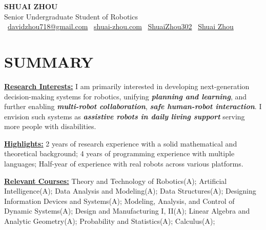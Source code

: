 \documentclass[a4paper,9pt]{extarticle}
\begin{document}
\pagestyle{fancy}
\renewcommand{\headrulewidth}{0pt}
\fancyhead{}
\thispagestyle{empty} %

\begin{center}
{\fontsize{24pt}{36pt}\selectfont\textbf{SHUAI ZHOU}}\\[3pt] %
Senior Undergraduate Student of Robotics \\[2pt]
\faEnvelope\ \href{mailto:davidzhou718@gmail.com}{davidzhou718@gmail.com}
\quad \textbar{} \quad
\faHome\ \href{https://www.shuai-zhou.com}{shuai-zhou.com}
\quad \textbar{} \quad
\faGithub\ \href{https://github.com/ShuaiZhou302}{ShuaiZhou302}
\quad \textbar{} \quad
\faGraduationCap\ \href{https://scholar.google.com/citations?user=ONn1TXAAAAAJ&hl=en&oi=sra}{Shuai Zhou}
\end{center}

\section*{{\textbf{\fontsize{14pt}{8pt}\selectfont S}\textbf{\scshape UMMARY}}}
\underline{\textbf{Research Interests:}} I am primarily interested in developing next-generation decision-making systems for robotics, unifying \textit{\textbf{planning and learning}}, and further enabling \textit{\textbf{multi-robot collaboration}}, \textit{\textbf{safe human-robot interaction}}. I envision such systems as \textit{\textbf{assistive robots in daily living support}} serving more people with disabilities.
\par\vspace{4pt}\noindent
\underline{\textbf{Highlights:}} 2 years of research experience with a solid mathematical and theoretical background; 4 years of programming experience with multiple languages; Half-year of experience with real robots across various platforms.
\par\vspace{4pt}\noindent
\underline{\textbf{Relevant Courses:}} Theory and Technology of Robotics(A); Artificial Intelligence(A); Data Analysis and Modeling(A); Data Structures(A); Designing Information Devices and Systems(A); Modeling, Analysis, and Control of Dynamic Systems(A); Design and Manufacturing I, II(A); Linear Algebra and Analytic Geometry(A); Probability and Statistics(A); Calculus(A);
\end{document}
